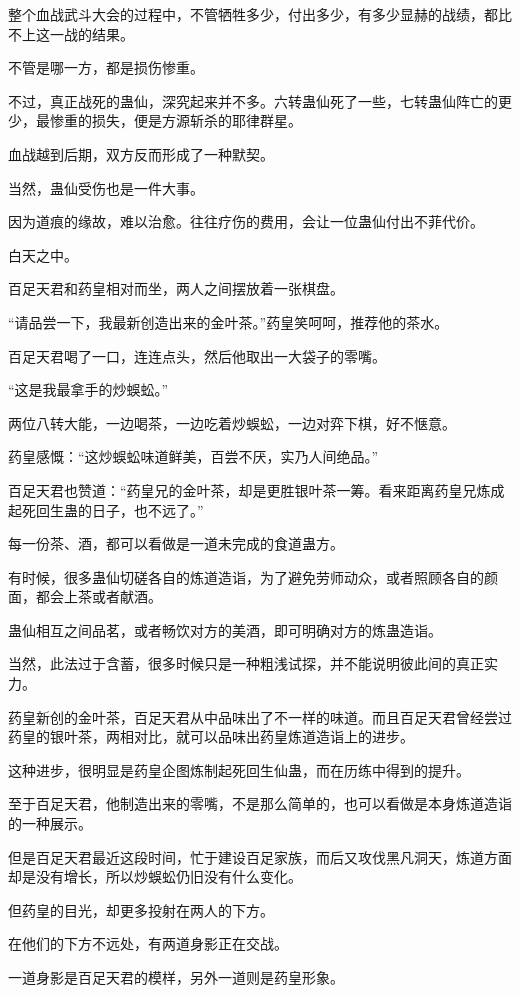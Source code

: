 \begin{this_body}
整个血战武斗大会的过程中，不管牺牲多少，付出多少，有多少显赫的战绩，都比不上这一战的结果。

不管是哪一方，都是损伤惨重。

不过，真正战死的蛊仙，深究起来并不多。六转蛊仙死了一些，七转蛊仙阵亡的更少，最惨重的损失，便是方源斩杀的耶律群星。

血战越到后期，双方反而形成了一种默契。

当然，蛊仙受伤也是一件大事。

因为道痕的缘故，难以治愈。往往疗伤的费用，会让一位蛊仙付出不菲代价。

白天之中。

百足天君和药皇相对而坐，两人之间摆放着一张棋盘。

“请品尝一下，我最新创造出来的金叶茶。”药皇笑呵呵，推荐他的茶水。

百足天君喝了一口，连连点头，然后他取出一大袋子的零嘴。

“这是我最拿手的炒蜈蚣。”

两位八转大能，一边喝茶，一边吃着炒蜈蚣，一边对弈下棋，好不惬意。

药皇感慨：“这炒蜈蚣味道鲜美，百尝不厌，实乃人间绝品。”

百足天君也赞道：“药皇兄的金叶茶，却是更胜银叶茶一筹。看来距离药皇兄炼成起死回生蛊的日子，也不远了。”

每一份茶、酒，都可以看做是一道未完成的食道蛊方。

有时候，很多蛊仙切磋各自的炼道造诣，为了避免劳师动众，或者照顾各自的颜面，都会上茶或者献酒。

蛊仙相互之间品茗，或者畅饮对方的美酒，即可明确对方的炼蛊造诣。

当然，此法过于含蓄，很多时候只是一种粗浅试探，并不能说明彼此间的真正实力。

药皇新创的金叶茶，百足天君从中品味出了不一样的味道。而且百足天君曾经尝过药皇的银叶茶，两相对比，就可以品味出药皇炼道造诣上的进步。

这种进步，很明显是药皇企图炼制起死回生仙蛊，而在历练中得到的提升。

至于百足天君，他制造出来的零嘴，不是那么简单的，也可以看做是本身炼道造诣的一种展示。

但是百足天君最近这段时间，忙于建设百足家族，而后又攻伐黑凡洞天，炼道方面却是没有增长，所以炒蜈蚣仍旧没有什么变化。

但药皇的目光，却更多投射在两人的下方。

在他们的下方不远处，有两道身影正在交战。

一道身影是百足天君的模样，另外一道则是药皇形象。


\end{this_body}
